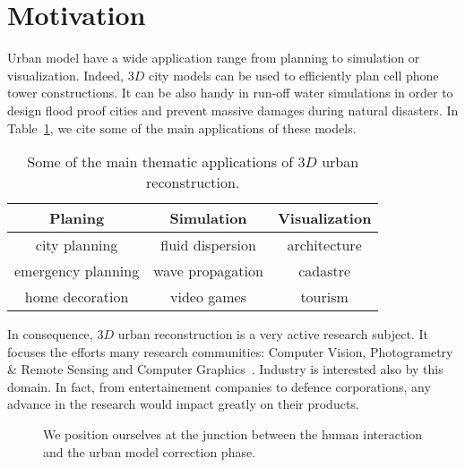 \documentclass[../main.tex]{subfiles}
\begin{document}
    \section{Motivation}

    Urban model have a wide application range from planning to simulation or visualization. Indeed, $3D$ city models can be used to efficiently plan cell phone tower constructions. It can be also handy in run-off water simulations in order to design flood proof cities and prevent massive damages during natural disasters. In Table~\ref{tab::3d_applications}, we cite some of the main applications of these models.\\

    \begin{table}[H]
        \begin{center}
            \begin{tabular}{c c c}
                \toprule
                Planing & Simulation & Visualization\\
                \midrule
                city planning & fluid dispersion & architecture \\
                emergency planning & wave propagation & cadastre \\
                home decoration & video games & tourism \\
                \bottomrule
            \end{tabular}
            \caption{\label{tab::3d_applications} Some of the main thematic applications of $3D$ urban reconstruction\cite{Scholze2002}.}
        \end{center}
    \end{table}

    In consequence, $3D$ urban reconstruction is a very active research subject. It focuses the efforts many research communities: Computer Vision, Photogrametry \& Remote Sensing and Computer Graphics~\cite{Musialski2012}. Industry is interested also by this domain. In fact, from entertainement companies to defence corporations, any advance in the research would impact greatly on their products.\\

    \begin{figure}[H]
        \begin{center}
            
            \caption{\label{fig::situation} We position ourselves at the junction between the human interaction and the urban model correction phase.}
        \end{center}
    \end{figure}
\end{document}
